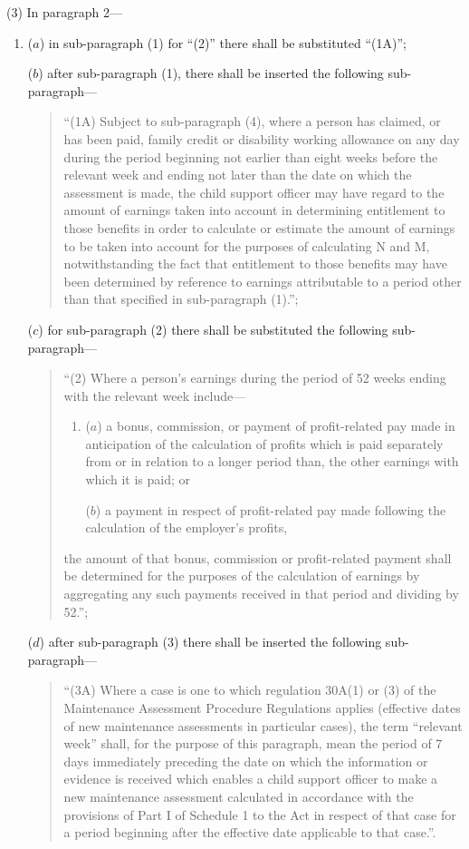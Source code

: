 \documentclass[12pt,a4paper]{article}
\begin{document}
(3) In paragraph 2—
\begin{enumerate}\item[]
($a$) in sub-paragraph (1) for “(2)” there shall be substituted “(1A)”;

($b$) after sub-paragraph (1), there shall be inserted the following sub-paragraph—
\begin{quotation}
“(1A) Subject to sub-paragraph (4), where a person has claimed, or has been paid, family credit or disability working allowance on any day during the period beginning not earlier than eight weeks before the relevant week and ending not later than the date on which the assessment is made, the child support officer may have regard to the amount of earnings taken into account in determining entitlement to those benefits in order to calculate or estimate the amount of earnings to be taken into account for the purposes of calculating N and M, notwithstanding the fact that entitlement to those benefits may have been determined by reference to earnings attributable to a period other than that specified in sub-paragraph (1).”;
\end{quotation}

($c$) for sub-paragraph (2) there shall be substituted the following sub-paragraph—
\begin{quotation}
“(2) Where a person’s earnings during the period of 52 weeks ending with the relevant week include—
\begin{enumerate}\item[]
($a$) a bonus, commission, or payment of profit-related pay made in anticipation of the calculation of profits which is paid separately from or in relation to a longer period than, the other earnings with which it is paid; or

($b$) a payment in respect of profit-related pay made following the calculation of the employer’s profits,
\end{enumerate}
the amount of that bonus, commission or profit-related payment shall be determined for the purposes of the calculation of earnings by aggregating any such payments received in that period and dividing by 52.”;
\end{quotation}

($d$) after sub-paragraph (3) there shall be inserted the following sub-paragraph—
\begin{quotation}
“(3A) Where a case is one to which regulation 30A(1) or (3) of the Maintenance Assessment Procedure Regulations applies (effective dates of new maintenance assessments in particular cases), the term “relevant week” shall, for the purpose of this paragraph, mean the period of 7 days immediately preceding the date on which the information or evidence is received which enables a child support officer to make a new maintenance assessment calculated in accordance with the provisions of Part I of Schedule 1 to the Act in respect of that case for a period beginning after the effective date applicable to that case.”.
\end{quotation}
\end{enumerate}
\end{document}
